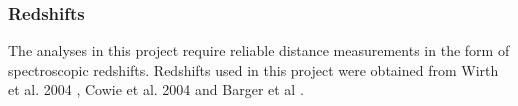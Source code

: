 \documentclass[11pt,twocolumn]{article}
\begin{document}

\subsubsection{\normalsize Redshifts}
The analyses in this project require reliable distance measurements in the form of spectroscopic redshifts. Redshifts used in this project were obtained from  Wirth et al. 2004 \cite{2004AJ....127.3121W}, Cowie et al. 2004 \cite{2004AJ....127.3137C}  and Barger et al \cite{2008ApJ...689..687B}. 





\end{document}
